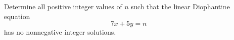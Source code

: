 Determine all positive integer values of $n$ such that the linear Diophantine equation \[7x+5y=n\]has no nonnegative integer solutions.
